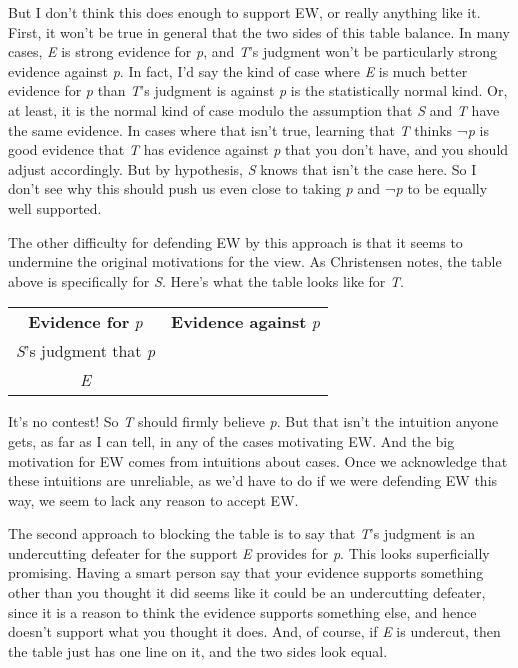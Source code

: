 \documentclass[
  11pt,
  letterpaper,
  DIV=11,
  numbers=noendperiod,
  twoside]{scrartcl}
\begin{document}
But I don't think this does enough to support EW, or really anything
like it. First, it won't be true in general that the two sides of this
table balance. In many cases, \emph{E} is strong evidence for \emph{p},
and \emph{T}'s judgment won't be particularly strong evidence against
\emph{p}. In fact, I'd say the kind of case where \emph{E} is much
better evidence for \emph{p} than \emph{T}'s judgment is against
\emph{p} is the statistically normal kind. Or, at least, it is the
normal kind of case modulo the assumption that \emph{S} and \emph{T}
have the same evidence. In cases where that isn't true, learning that
\emph{T} thinks ¬\emph{p} is good evidence that \emph{T} has evidence
against \emph{p} that you don't have, and you should adjust accordingly.
But by hypothesis, \emph{S} knows that isn't the case here. So I don't
see why this should push us even close to taking \emph{p} and ¬\emph{p}
to be equally well supported.

The other difficulty for defending EW by this approach is that it seems
to undermine the original motivations for the view. As Christensen
notes, the table above is specifically for \emph{S}. Here's what the
table looks like for \emph{T}.

\begin{longtable}[]{@{}cc@{}}
\toprule\noalign{}
\endhead
\bottomrule\noalign{}
\endlastfoot
\textbf{Evidence for} \emph{p} & \textbf{Evidence against} \emph{p} \\
\emph{S}'s judgment that \emph{p} & \\
\emph{E} & \\
\end{longtable}

It's no contest! So \emph{T} should firmly believe \emph{p}. But that
isn't the intuition anyone gets, as far as I can tell, in any of the
cases motivating EW. And the big motivation for EW comes from intuitions
about cases. Once we acknowledge that these intuitions are unreliable,
as we'd have to do if we were defending EW this way, we seem to lack any
reason to accept EW.

The second approach to blocking the table is to say that \emph{T}'s
judgment is an undercutting defeater for the support \emph{E} provides
for \emph{p}. This looks superficially promising. Having a smart person
say that your evidence supports something other than you thought it did
seems like it could be an undercutting defeater, since it is a reason to
think the evidence supports something else, and hence doesn't support
what you thought it does. And, of course, if \emph{E} is undercut, then
the table just has one line on it, and the two sides look equal.
\end{document}
